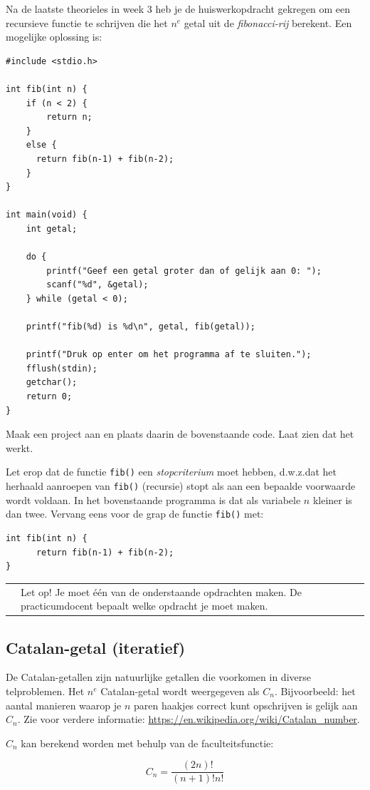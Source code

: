\documentclass[a4paper,10pt,fleqn,twoside]{article}
\newcommand{\letop}{%
\vspace*{2ex}
\begin{mdframed}[outerlinewidth = 1 ,%
roundcorner = 4 pt,%
leftmargin = 40,%
rightmargin = 40,%
backgroundcolor = yellow!40,%
outerlinecolor = red!70!black,%
innertopmargin = \topskip,%
splittopskip = \topskip,%
]
\begin{tabularx}{\linewidth}{m{1cm}X}
\Large\leftpointright & Let op! Je moet één van de onderstaande opdrachten maken. De practicumdocent bepaalt welke opdracht je moet maken.
\end{tabularx}
\end{mdframed}
}
\begin{document}
Na de laatste theorieles in week 3 heb je de huiswerkopdracht gekregen om een recursieve functie te schrijven die het $n^e$ getal uit de \textsl{fibonacci-rij} berekent. Een mogelijke oplossing is:

\begin{lstlisting}
#include <stdio.h>

int fib(int n) {
    if (n < 2) {
        return n;
	}
	else {
	  return fib(n-1) + fib(n-2);
	}
} 

int main(void) {
    int getal;

    do {
        printf("Geef een getal groter dan of gelijk aan 0: ");
        scanf("%d", &getal);
    } while (getal < 0);

    printf("fib(%d) is %d\n", getal, fib(getal));

    printf("Druk op enter om het programma af te sluiten.");
    fflush(stdin);
    getchar();
    return 0;
}
\end{lstlisting}

Maak een project aan en plaats daarin de bovenstaande code. Laat zien dat het werkt.

Let erop dat de functie \lstinline|fib()| een \textsl{stopcriterium} moet hebben, d.w.z.\@ dat het herhaald aanroepen van \lstinline|fib()| (recursie) stopt als aan een bepaalde voorwaarde wordt voldaan. In het bovenstaande programma is dat als variabele $n$ kleiner is dan twee. Vervang eens voor de grap de functie \lstinline|fib()| met:

\begin{lstlisting}
int fib(int n) {
      return fib(n-1) + fib(n-2);
} 
\end{lstlisting}



\letop

\subsection{Catalan-getal (iteratief)}
De Catalan-getallen zijn natuurlijke getallen die voorkomen in diverse telproblemen. Het $n^e$ Catalan-getal wordt weergegeven als $C_n$. Bijvoorbeeld: het aantal manieren waarop je $n$ paren haakjes correct kunt opschrijven is gelijk aan $C_n$. Zie voor verdere informatie: \url{https://en.wikipedia.org/wiki/Catalan_number}.

$C_n$ kan berekend worden met behulp van de faculteitsfunctie: 

\begin{equation*}
C_n = \dfrac{(2n)!}{(n+1)!n!}
\end{equation*}
\end{document}
